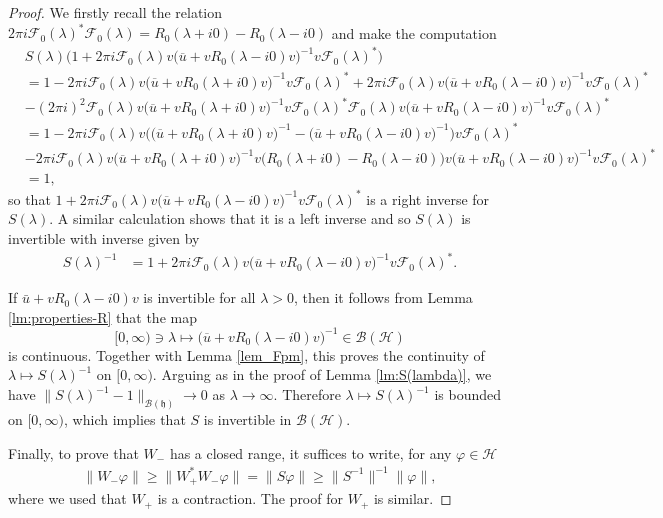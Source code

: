 \documentclass{article}
\def\B{\mathscr B}
\def\F{\mathscr F}
\def\H{\mathcal H}
\def\HS{\mathfrak h}
\begin{document}
\begin{proof}
We firstly recall the relation $2\pi i \F_0(\lambda)^*\F_0(\lambda) = R_0(\lambda+i0)-R_0(\lambda-i0)$ and make the computation
\begin{align*}
&S(\lambda)\big(1+2\pi i \F_0(\lambda)v\big(\overline{u} + vR_0(\lambda-i0)v\big)^{-1} v \F_0(\lambda)^*) \\
&= 1 -2\pi i \F_0(\lambda) v \big(\overline{u} +v R_0(\lambda+i0)v\big)^{-1}v \F_0(\lambda)^* +2\pi i \F_0(\lambda)v\big(\overline{u} + vR_0(\lambda-i0)v\big)^{-1} v \F_0(\lambda)^* \\
&-(2\pi i)^2 \F_0(\lambda) v\big(\overline{u}+vR_0(\lambda+i0)v\big)^{-1}v\F_0(\lambda)^*\F_0(\lambda)v\big(\overline{u} + v R_0(\lambda -i0)v\big)^{-1} v\F_0(\lambda)^* \\
&= 1 - 2\pi i \F_0(\lambda) v \big( \big(\overline{u}+vR_0(\lambda+i0)v\big)^{-1}-\big(\overline{u} + vR_0(\lambda-i0)v\big)^{-1} \big) v\F_0(\lambda)^* \\
&- 2\pi i \F_0(\lambda) v \big(\overline{u} +v R_0(\lambda+i0)v\big)^{-1}v \big(R_0(\lambda+i0)-R_0(\lambda-i0)  \big) v \big(\overline{u} + vR_0(\lambda-i0)v\big)^{-1} v \F_0(\lambda)^* \\
&= 1,
\end{align*}
so that $1+2\pi i \F_0(\lambda)v\big(\overline{u} + vR_0(\lambda-i0)v\big)^{-1} v \F_0(\lambda)^*$ is a right inverse for $S(\lambda)$. A similar calculation shows that it is a left inverse and so $S(\lambda)$ is invertible with inverse given by
\begin{align*}
S(\lambda)^{-1} &= 1+2\pi i \F_0(\lambda)v\big(\overline{u} + vR_0(\lambda-i0)v\big)^{-1} v \F_0(\lambda)^*.
\end{align*}

If $\bar u +vR_0(\lambda-i0)v$ is invertible for all $\lambda>0$, then it follows from Lemma \ref{lm:properties-R} that the map 
\begin{equation*}
[0,\infty)\ni\lambda\mapsto\big(\overline{u} + vR_0(\lambda-i0)v\big)^{-1}\in\B(\H)
\end{equation*}
is continuous. Together with Lemma \ref{lem_Fpm}, this proves the continuity of $\lambda\mapsto S(\lambda)^{-1}$ on $[0,\infty)$.
Arguing as in the proof of Lemma \ref{lm:S(lambda)}, we have $\|S(\lambda)^{-1}-1\|_{\B(\HS)}\to 0$ as $\lambda\to\infty$. 
Therefore $\lambda\mapsto S(\lambda)^{-1}$ is bounded on $[0,\infty)$, which implies that $S$ is invertible in $\B(\H)$.

Finally, to prove that $W_-$ has a closed range, it suffices to write, for any $\varphi\in\H$
\begin{align*}
\|W_-\varphi\|\ge\|W_+^*W_-\varphi\|=\|S\varphi\|\ge\|S^{-1}\|^{-1}\|\varphi\|,
\end{align*}
where we used that $W_+$ is a contraction. The proof for $W_+$ is similar.
\end{proof}
\end{document}
